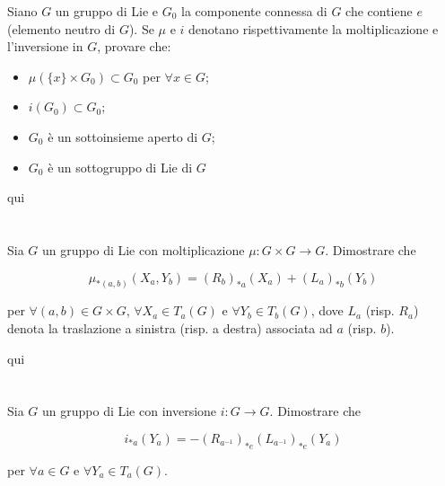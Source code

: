 \begin{tcolorbox}
	Siano $ G $ un gruppo di Lie e $ G_{0} $ la componente connessa di $ G $ che contiene $ e $ (elemento neutro di $ G $). Se $ \mu $ e $ i $ denotano rispettivamente la moltiplicazione e l'inversione in $ G $, provare che:
	
	\begin{itemize}
		\item $ \mu(\{x\} \times G_{0}) \subset G_{0} $ per $ \forall x \in G $;
		
		\item $ i(G_{0}) \subset G_{0} $;
		
		\item $ G_{0} $ è un sottoinsieme aperto di $ G $;
		
		\item $ G_{0} $ è un sottogruppo di Lie di $ G $
	\end{itemize}
\end{tcolorbox}

qui

\section{}\label{es3-7}

\begin{tcolorbox}
	Sia $ G $ un gruppo di Lie con moltiplicazione $ \mu : G \times G \to G $. Dimostrare che
	
	\begin{equation}
		\mu_{*(a,b)}(X_{a},Y_{b}) = (R_{b})_{*a}(X_{a}) + (L_{a})_{*b}(Y_{b})
	\end{equation}

	per $ \forall (a,b) \in G \times G $, $ \forall X_{a} \in T_{a}(G) $ e $ \forall Y_{b} \in T_{b}(G) $, dove $ L_{a} $ (risp. $ R_{a} $) denota la traslazione a sinistra (risp. a destra) associata ad $ a $ (risp. $ b $).
\end{tcolorbox}

qui

\section{}\label{es3-8}

\begin{tcolorbox}
		Sia $ G $ un gruppo di Lie con inversione $ i : G \to G $. Dimostrare che
	
	\begin{equation}
		i_{*a}(Y_{a}) = -(R_{a^{-1}})_{*e}(L_{a^{-1}})_{*e} (Y_{a})
	\end{equation}
	
	per $ \forall a \in G $ e $ \forall Y_{a} \in T_{a}(G) $.
\end{tcolorbox}

